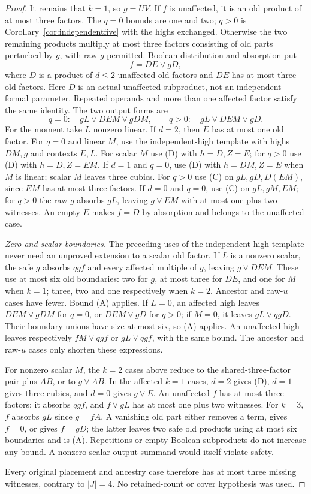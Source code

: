 \documentclass[11pt]{article}
\theoremstyle{definition}
\theoremstyle{remark}
\begin{document}
\begin{proof}
It remains that $k=1$, so $g=UV$. If $f$ is unaffected, it is an old product of at most three factors. The $q=0$ bounds are one and two; $q>0$ is Corollary~\ref{cor:independentfive} with the highs exchanged. Otherwise the two remaining products multiply at most three factors consisting of old parts perturbed by $g$, with raw $g$ permitted. Boolean distribution and absorption put
\[
 f=DE\vee gD,
\]
where $D$ is a product of $d\le2$ unaffected old factors and $DE$ has at most three old factors. Here $D$ is an actual unaffected subproduct, not an independent formal parameter. Repeated operands and more than one affected factor satisfy the same identity. The two output forms are
\[
 q=0:\quad gL\vee DEM\vee gDM,
 \qquad
 q>0:\quad gL\vee DEM\vee gD.
\]
For the moment take $L$ nonzero linear. If $d=2$, then $E$ has at most one old factor. For $q=0$ and linear $M$, use the independent-high template with highs $DM,g$ and contexts $E,L$. For scalar $M$ use (D) with $h=D,Z=E$; for $q>0$ use (D) with $h=D,Z=EM$. If $d=1$ and $q=0$, use (D) with $h=DM,Z=E$ when $M$ is linear; scalar $M$ leaves three cubics. For $q>0$ use (C) on $gL,gD,D(EM)$, since $EM$ has at most three factors. If $d=0$ and $q=0$, use (C) on $gL,gM,EM$; for $q>0$ the raw $g$ absorbs $gL$, leaving $g\vee EM$ with at most one plus two witnesses. An empty $E$ makes $f=D$ by absorption and belongs to the unaffected case.

\emph{Zero and scalar boundaries.} The preceding uses of the independent-high template never need an unproved extension to a scalar old factor. If $L$ is a nonzero scalar, the safe $g$ absorbs $qgf$ and every affected multiple of $g$, leaving $g\vee DEM$. These use at most six old boundaries: two for $g$, at most three for $DE$, and one for $M$ when $k=1$; three, two and one respectively when $k=2$. Ancestor and raw-$u$ cases have fewer. Bound (A) applies. If $L=0$, an affected high leaves $DEM\vee gDM$ for $q=0$, or $DEM\vee gD$ for $q>0$; if $M=0$, it leaves $gL\vee qgD$. Their boundary unions have size at most six, so (A) applies. An unaffected high leaves respectively $fM\vee qgf$ or $gL\vee qgf$, with the same bound. The ancestor and raw-$u$ cases only shorten these expressions.

For nonzero scalar $M$, the $k=2$ cases above reduce to the shared-three-factor pair plus $AB$, or to $g\vee AB$. In the affected $k=1$ cases, $d=2$ gives (D), $d=1$ gives three cubics, and $d=0$ gives $g\vee E$. An unaffected $f$ has at most three factors; it absorbs $qgf$, and $f\vee gL$ has at most one plus two witnesses. For $k=3$, $f$ absorbs $gL$ since $g=fA$. A vanishing old part either removes a term, gives $f=0$, or gives $f=gD$; the latter leaves two safe old products using at most six boundaries and is (A). Repetitions or empty Boolean subproducts do not increase any bound. A nonzero scalar output summand would itself violate safety.

Every original placement and ancestry case therefore has at most three missing witnesses, contrary to $|J|=4$. No retained-count or cover hypothesis was used.
\end{proof}
\end{document}
